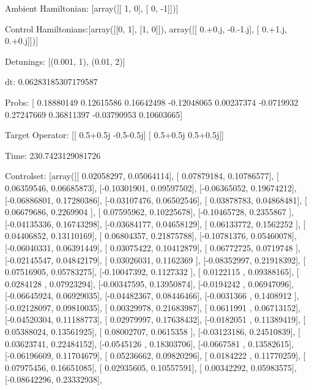 \documentclass{article}
\begin{document}
    

\newpage

Ambient Hamiltonian: [array([[ 1,  0],
       [ 0, -1]])]

Control Hamiltonians:[array([[0, 1],
       [1, 0]]), array([[ 0.+0.j, -0.-1.j],
       [ 0.+1.j,  0.+0.j]])]

Detunings: [(0.001, 1), (0.01, 2)]

 dt: 0.06283185307179587

Probs: [ 0.18880149  0.12615586  0.16642498 -0.12048065  0.00237374 -0.0719932
  0.27247669  0.36811397 -0.03790953  0.10603665]

Target Operator: [[ 0.5+0.5j -0.5-0.5j]
 [ 0.5+0.5j  0.5+0.5j]]

Time: 230.7423129081726

Controlset: [array([[ 0.02058297,  0.05064114],
       [ 0.07879184,  0.10786577],
       [ 0.06359546,  0.06685873],
       [-0.10301901,  0.09597502],
       [-0.06365052,  0.19674212],
       [-0.06886801,  0.17280386],
       [-0.03107476,  0.06502546],
       [ 0.03878783,  0.04868481],
       [ 0.06679686,  0.2269904 ],
       [ 0.07595962,  0.10225678],
       [-0.10465728,  0.2355867 ],
       [-0.04135336,  0.16743298],
       [-0.03684177,  0.04658129],
       [ 0.06133772,  0.1562252 ],
       [ 0.04406852,  0.13110169],
       [ 0.06804357,  0.21875788],
       [-0.10781376,  0.05460078],
       [-0.06040331,  0.06391449],
       [ 0.03075422,  0.10412879],
       [ 0.06772725,  0.0719748 ],
       [-0.02145547,  0.04842179],
       [ 0.03026031,  0.1162369 ],
       [-0.08352997,  0.21918392],
       [ 0.07516905,  0.05783275],
       [-0.10047392,  0.1127332 ],
       [ 0.0122115 ,  0.09388165],
       [ 0.0284128 ,  0.07923294],
       [-0.00347595,  0.13950874],
       [-0.0194242 ,  0.06947096],
       [-0.06645924,  0.06929035],
       [-0.04482367,  0.08446466],
       [-0.0031366 ,  0.1408912 ],
       [-0.02128097,  0.09810035],
       [ 0.00329978,  0.21683987],
       [ 0.0611991 ,  0.06713152],
       [-0.04520304,  0.11188773],
       [ 0.02979997,  0.17638432],
       [-0.0182051 ,  0.11389419],
       [ 0.05388024,  0.13561925],
       [ 0.08002707,  0.0615358 ],
       [-0.03123186,  0.24510839],
       [ 0.03623741,  0.22484152],
       [-0.0545126 ,  0.18303706],
       [-0.0667581 ,  0.13582615],
       [-0.06196609,  0.11704679],
       [ 0.05236662,  0.09820296],
       [ 0.0184222 ,  0.11770259],
       [ 0.07975456,  0.16651085],
       [ 0.02935605,  0.10557591],
       [ 0.00342292,  0.05983575],
       [-0.08642296,  0.23332938],
\end{document}
